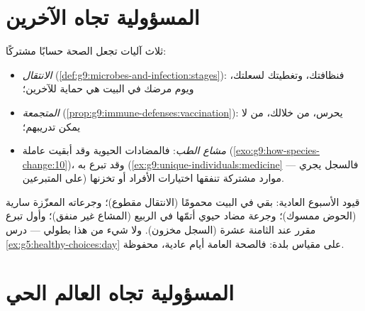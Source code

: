 \section{المسؤولية تجاه الآخرين}

\begin{proposition}\label{prop:g9:our-responsibility:others}
ثلاث آليات تجعل الصحة حسابًا مشتركًا:
\begin{itemize}
  \item \emph{الانتقال}
        (\cref{def:g9:microbes-and-infection:stages}):
        فنظافتك، وتغطيتك لسعلتك، ويوم مرضك في البيت هي
        حماية للآخرين؛
  \item \emph{ المتجمعة}
        (\cref{prop:g9:immune-defenses:vaccination}):
         يحرس، من خلالك، من لا يمكن تدريبهم؛
  \item \emph{مشاع الطب}: فالمضادات الحيوية وقد أبقيت
        عاملة (\cref{exo:g9:how-species-change:10})،
         وقد تبرع به
        (\cref{ex:g9:unique-individuals:medicine} ---
        فالسجل يجري على المتبرعين) موارد مشتركة تنفقها
        اختيارات الأفراد أو تخزنها.
\end{itemize}
\end{proposition}
\admitted

\begin{example}\label{ex:g9:our-responsibility:account}
قيود الأسبوع العادية: بقي في البيت محمومًا (الانتقال
مقطوع)؛ وجرعاته المعزّزة سارية (الحوض ممسوك)؛ وجرعة مضاد
حيوي أتمّها في الربيع (المشاع غير منفق)؛ وأول تبرع 
مقرر عند الثامنة عشرة (السجل مخزون). ولا شيء من هذا
بطولي --- درس \cref{ex:g5:healthy-choices:day} على مقياس
بلدة: فالصحة العامة أيام عادية، محفوظة.
\end{example}

\section{المسؤولية تجاه العالم الحي}

